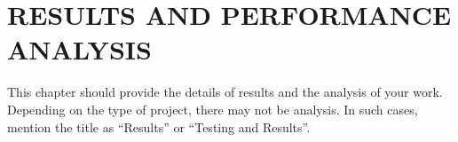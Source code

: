 
\chapter{\uppercase{Results and Performance Analysis}} %
\label{chap5} %
This chapter should provide the details of results and the analysis of your work. Depending on the type of project, there may not be analysis. In such cases, mention the title as ``Results'' or ``Testing and Results''.

